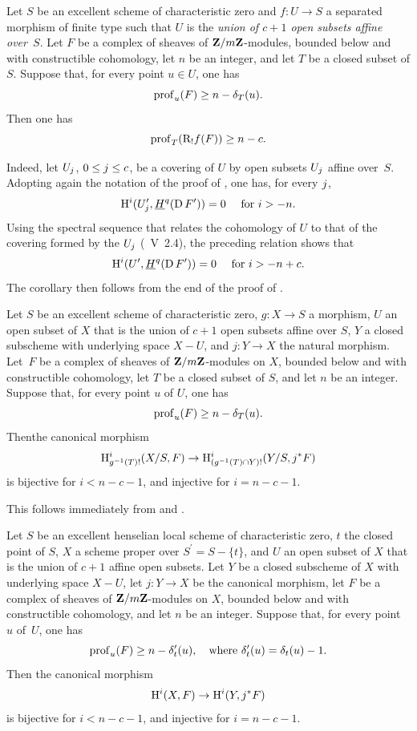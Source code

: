 \begin{corollaire} \label{XIV.4.3}
Let $S$ be an excellent scheme of characteristic zero and $f\colon U\to S$ a separated morphism of finite type such that $U$ is the \emph{union of $c+1$ open subsets affine over~$S$}. Let $F$ be a complex of sheaves of $\ZZ/m\ZZ$-modules, bounded below and with constructible cohomology, let $n$ be an integer, and let $T$ be a closed subset of $S$. Suppose that, for every point $u\in U$, one has
$$
\prof_{u}(F)\geq n-\delta_{T}(u).
$$
Then one has\pageoriginale
$$
\prof_{T}(\R_{!}f(F))\geq n-c.
$$
\end{corollaire}

Indeed, let $U_{\sisi{i}{j}}$, $0\leq \sisi{i}{j}\leq c$, be a covering of $U$ by open subsets $U_{\sisi{i}{j}}$ affine over~$S$. Adopting again the notation of the proof of , one has, for every $\sisi{i}{j}$,
$$
\H^{i}(U_{\sisi{i}{j}}^{\prime}, \underline{H}^{q}(\D F^{\prime}))=0\quad\textrm{ for }i>-n.
$$
Using the spectral sequence that relates the cohomology of $U$ to that of the covering formed by the $U_{\sisi{i}{j}}$ (~V~2.4), the preceding relation shows that
$$
\H^{i}(U^{\prime}, \underline{H}^{q}(\D F^{\prime}))=0\quad\textrm{ for }i>-n+c.
$$
The corollary then follows from the end of the proof of .

\begin{corollaire} \label{XIV.4.4}
Let $S$ be an excellent scheme of characteristic zero, $g\colon X\to S$ a morphism, $U$ an open subset of $X$ that is the union of $c+1$ open subsets affine over $S$, $Y$ a closed subscheme with underlying space $X-U$, and $j\colon Y\to X$ the natural morphism. Let~$F$ be a complex of sheaves of $\ZZ/m\ZZ$-modules on $X$, bounded below and with constructible cohomology, let $T$ be a closed subset of $S$, and let $n$ be an integer. Suppose that, for every point $u$ of $U$, one has
$$
\prof_{u}(F)\geq n-\delta_{T}(u).
$$
Then\pageoriginale the canonical morphism
$$
\H_{g^{-1}(T)!}^{i}(X/S, F)\to\H_{(g^{-1}(T)\cap Y)!}^{i}(Y/S, j^{\ast}F)$$
is bijective for $i<n-c-1$, and injective for $i=n-c-1$.
\end{corollaire}

This follows immediately from  and .

\begin{corollaire} \label{XIV.4.5}
Let $S$ be an excellent henselian local scheme of characteristic zero, $t$ the closed point of $S$, $X$ a scheme proper over $S^{\prime}=S-\{ t\}$, and $U$ an open subset of $X$ that is the union of $c+1$ affine open subsets. Let $Y$ be a closed subscheme of $X$ with underlying space $X-U$, let $j\colon Y\to X$ be the canonical morphism, let $F$ be a complex of sheaves of $\ZZ/m\ZZ$-modules on $X$, bounded below and with constructible cohomology, and let $n$ be an integer. Suppose that, for every point $u$ of~$U$, one has
$$
\prof_{u}(F)\geq n-\delta_{t}^{\prime}(u), \quad\text{where } \delta_{t}^{\prime}(u)=\delta_{t}(u)-1.
$$
Then the canonical morphism
$$
\H^{i}(X, F)\to\H^{i}(Y, j^{\ast}F)$$
is bijective for $i<n-c-1$, and injective for $i=n-c-1$.
\end{corollaire}

